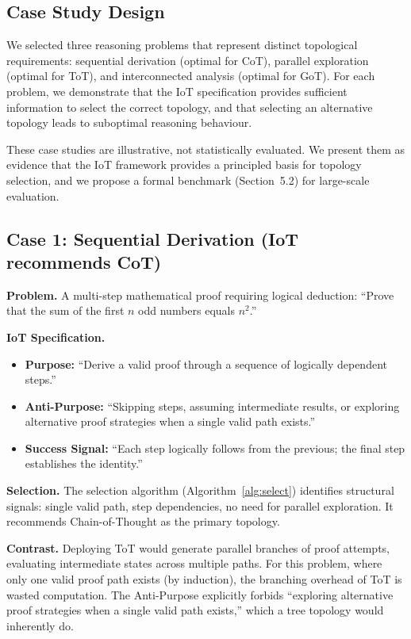 \documentclass[11pt,a4paper]{article}
\begin{document}
\subsection{Case Study Design}

We selected three reasoning problems that represent distinct topological requirements: sequential derivation (optimal for CoT), parallel exploration (optimal for ToT), and interconnected analysis (optimal for GoT). For each problem, we demonstrate that the IoT specification provides sufficient information to select the correct topology, and that selecting an alternative topology leads to suboptimal reasoning behaviour.

These case studies are illustrative, not statistically evaluated. We present them as evidence that the IoT framework provides a principled basis for topology selection, and we propose a formal benchmark (Section~5.2) for large-scale evaluation.

\subsection{Case 1: Sequential Derivation (IoT recommends CoT)}

\textbf{Problem.} A multi-step mathematical proof requiring logical deduction: ``Prove that the sum of the first $n$ odd numbers equals $n^2$.''

\textbf{IoT Specification.}
\begin{itemize}
  \item \textbf{Purpose:} ``Derive a valid proof through a sequence of logically dependent steps.''
  \item \textbf{Anti-Purpose:} ``Skipping steps, assuming intermediate results, or exploring alternative proof strategies when a single valid path exists.''
  \item \textbf{Success Signal:} ``Each step logically follows from the previous; the final step establishes the identity.''
\end{itemize}

\textbf{Selection.} The selection algorithm (Algorithm~\ref{alg:select}) identifies structural signals: single valid path, step dependencies, no need for parallel exploration. It recommends Chain-of-Thought as the primary topology.

\textbf{Contrast.} Deploying ToT would generate parallel branches of proof attempts, evaluating intermediate states across multiple paths. For this problem, where only one valid proof path exists (by induction), the branching overhead of ToT is wasted computation. The Anti-Purpose explicitly forbids ``exploring alternative proof strategies when a single valid path exists,'' which a tree topology would inherently do.
\end{document}
